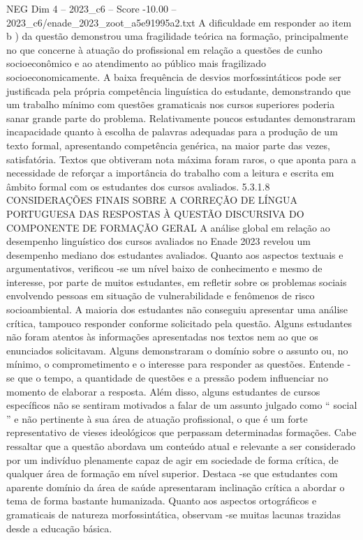 \begin{textsample}{NEG Dim 4 – 2023\_c6 – Score -10.00 – 2023\_c6/enade\_2023\_zoot\_a5e91995a2.txt}
A dificuldade em responder ao item b ) da questão demonstrou uma fragilidade teórica na formação, principalmente no que concerne à atuação do profissional em relação a questões de cunho socioeconômico e ao atendimento ao público mais fragilizado socioeconomicamente.
A baixa frequência de desvios morfossintáticos pode ser justificada pela própria competência linguística do estudante, demonstrando que um trabalho mínimo com questões gramaticais nos cursos superiores poderia sanar grande parte do problema.
Relativamente poucos estudantes demonstraram incapacidade quanto à escolha de palavras adequadas para a produção de um texto formal, apresentando competência genérica, na maior parte das vezes, satisfatória.
Textos que obtiveram nota máxima foram raros, o que aponta para a necessidade de reforçar a importância do trabalho com a leitura e escrita em âmbito formal com os estudantes dos cursos avaliados. 5.3.1.8 CONSIDERAÇÕES FINAIS SOBRE A CORREÇÃO DE LÍNGUA PORTUGUESA DAS RESPOSTAS À QUESTÃO DISCURSIVA DO COMPONENTE DE FORMAÇÃO GERAL A análise global em relação ao desempenho linguístico dos cursos avaliados no Enade 2023 revelou um desempenho mediano dos estudantes avaliados.
Quanto aos aspectos textuais e argumentativos, verificou -se um nível baixo de conhecimento e mesmo de interesse, por parte de muitos estudantes, em refletir sobre os problemas sociais envolvendo pessoas em situação de vulnerabilidade e fenômenos de risco socioambiental.
A maioria dos estudantes não conseguiu apresentar uma análise crítica, tampouco responder conforme solicitado pela questão.
Alguns estudantes não foram atentos às informações apresentadas nos textos nem ao que os enunciados solicitavam.
Alguns demonstraram o domínio sobre o assunto ou, no mínimo, o comprometimento e o interesse para responder as questões.
Entende -se que o tempo, a quantidade de questões e a pressão podem influenciar no momento de elaborar a resposta.
Além disso, alguns estudantes de cursos específicos não se sentiram motivados a falar de um assunto julgado como “ social ” e não pertinente à sua área de atuação profissional, o que é um forte representativo de vieses ideológicos que perpassam determinadas formações.
Cabe ressaltar que a questão abordava um conteúdo atual e relevante a ser considerado por um indivíduo plenamente capaz de agir em sociedade de forma crítica, de qualquer área de formação em nível superior.
Destaca -se que estudantes com aparente domínio da área de saúde apresentaram inclinação crítica a abordar o tema de forma bastante humanizada.
Quanto aos aspectos ortográficos e gramaticais de natureza morfossintática, observam -se muitas lacunas trazidas desde a educação básica.

\end{textsample}
